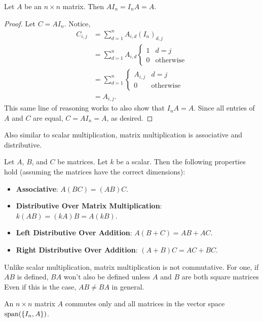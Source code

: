 \begin{theorem}
	Let $A$ be an $n \times n$ matrix.
	Then $AI_n = I_n A = A$.
\end{theorem}
\begin{proof}
	Let $C = AI_n$.
	Notice,
	\begin{align*}
		C_{i,j} &= \sum_{d=1}^{n}{A_{i,d}(I_{n})_{d,j}} \\
			&= \sum_{d=1}^{n}{A_{i,d} \begin{cases}
					1 & d=j \\
					0 & \text{otherwise}
			\end{cases}} \\
			&= \sum_{d=1}^{n}{\begin{cases}
				A_{i,j} & d=j \\
				0 & \text{otherwise}
			\end{cases}} \\
			&= A_{i,j}.
	\end{align*}
	This same line of reasoning works to also show that $I_nA = A$.
	Since all entries of $A$ and $C$ are equal, $C = AI_n = A$, as desired.
\end{proof}

Also similar to scalar multiplication, matrix multiplication is associative and distributive.
\begin{theorem}
	Let $A$, $B$, and $C$ be matrices.
	Let $k$ be a scalar.
	Then the following properties hold (assuming the matrices have the correct dimensions):
	\begin{itemize}
		\item \textbf{Associative}: $A(BC) = (AB)C$.
		\item \textbf{Distributive Over Matrix Multiplication}: $k(AB) = (kA)B = A(kB)$.
		\item \textbf{Left Distributive Over Addition}: $A(B + C) = AB + AC$.
		\item \textbf{Right Distributive Over Addition}: $(A + B)C = AC + BC$.
	\end{itemize}
\end{theorem}

Unlike scalar multiplication, matrix multiplication is not commutative.
For one, if $AB$ is defined, $BA$ won't also be defined unless $A$ and $B$ are both square matrices
Even if this is the case, $AB \neq BA$ in general.

\begin{theorem}
	An $n \times n$ matrix $A$ commutes only and all matrices in the vector space $\operatorname{span}(\{I_n, A\})$.
\end{theorem}